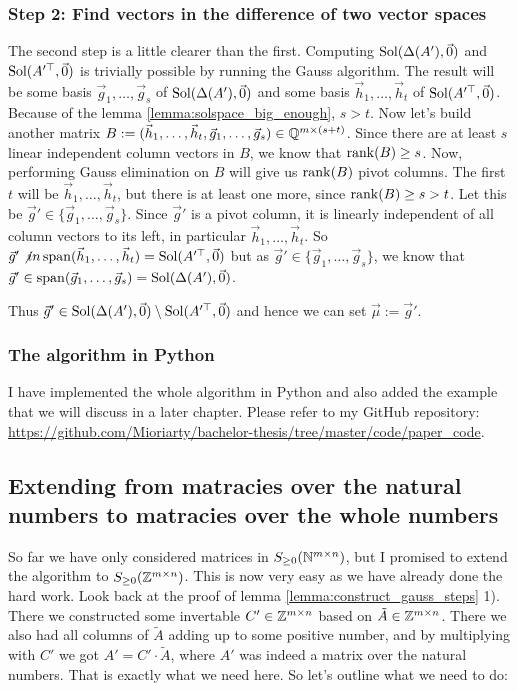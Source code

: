 \subsubsection{Step 2: Find vectors in the difference of two vector spaces}
The second step is a little clearer than the first. Computing $\operatorname{Sol}(\Delta(A'), \vec0)$ and $\operatorname{Sol}(A'^\top, \vec0)$ is trivially possible by running the Gauss algorithm. The result will be some basis $\vec g_{1}, \dots, \vec g_s$ of $\operatorname{Sol}(\Delta(A'), \vec0)$ and some basis $\vec h_1, \dots, \vec h_t$ of $\operatorname{Sol}(A'^\top, \vec0)$. Because of the lemma \ref{lemma:solspace_big_enough}, $s > t$. Now let's build another matrix $B := (\vec h_1, \dots, \vec h_t, \vec g_{1}, \dots, \vec g_s) \in \mathbb{Q}^{m\times(s+t)}$. Since there are at least $s$ linear independent column vectors in $B$, we know that $\operatorname{rank}(B)\geq s$. Now, performing Gauss elimination on $B$ will give us $\operatorname{rank}(B)$ pivot columns. The first $t$ will be $\vec h_1, \dots, \vec h_t$, but there is at least one more, since $\operatorname{rank}(B)\geq s > t$. Let this be $\vec g' \in \{\vec g_{1}, \dots, \vec g_s\}$. Since $\vec g'$ is a pivot column, it is linearly independent of all column vectors to its left, in particular $\vec h_1, \dots, \vec h_t$. So $\vec g' \not in \operatorname{span}(\vec h_1, \dots, \vec h_t) = \operatorname{Sol}(A'^\top, \vec0)$ but as $\vec g' \in \{\vec g_{1}, \dots, \vec g_s\}$, we know that $\vec g' \in \operatorname{span}(\vec g_{1}, \dots, \vec g_s) = \operatorname{Sol}(\Delta(A'), \vec0)$.

Thus $\vec g' \in \operatorname{Sol}(\Delta(A'), \vec0)\setminus\operatorname{Sol}(A'^\top, \vec0)$ and hence we can set $\vec\mu := \vec g'$.

\subsubsection{The algorithm in Python}
I have implemented the whole algorithm in Python and also added the example that we will discuss in a later chapter. Please refer to my GitHub repository: \url{https://github.com/Mioriarty/bachelor-thesis/tree/master/code/paper_code}.

\subsection{Extending from matracies over the natural numbers to matracies over the whole numbers}
So far we have only considered matrices in $S_{\geq 0}(\mathbb{N}^{m \times n})$, but I promised to extend the algorithm to $S_{\geq 0}(\mathbb{Z}^{m \times n})$. This is now very easy as we have already done the hard work. Look back at the proof of lemma \ref{lemma:construct_gauss_steps} 1). There we constructed some invertable $C'\in\mathbb{Z}^{m \times n}$ based on $\tilde A \in \mathbb{Z}^{m \times n}$. There we also had all columns of $\tilde A$ adding up to some positive number, and by multiplying with $C'$ we got $A' = C' \cdot \tilde A$, where $A'$ was indeed a matrix over the natural numbers. That is exactly what we need here. So let's outline what we need to do:

